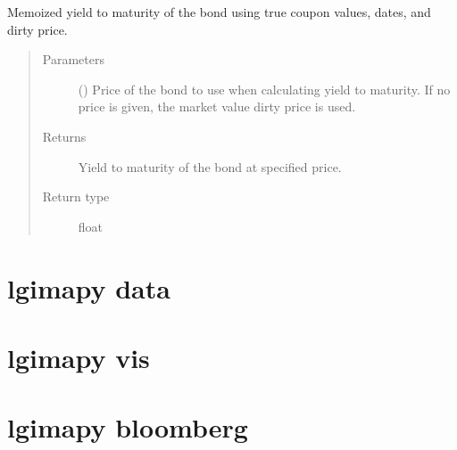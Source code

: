 \documentclass[letterpaper,10pt,english]{report}
\begin{document}
\begin{fulllineitems}
\begin{fulllineitems}
\label{\detokenize{index:lgimapy.models.TBond.ytm}}
Memoized yield to maturity of the bond using true coupon
values, dates, and dirty price.
\begin{quote}\begin{description}
\item[{Parameters}] \leavevmode
{} (\sphinxstyleliteralemphasis{\sphinxupquote{, }}) \textendash{} Price of the bond to use when calculating yield to maturity.
If no price is given, the market value dirty price is used.

\item[{Returns}] \leavevmode
{} \textendash{} Yield to maturity of the bond at specified price.

\item[{Return type}] \leavevmode
float

\end{description}\end{quote}

\end{fulllineitems}


\end{fulllineitems}



\chapter{lgimapy data}
\label{\detokenize{index:module-lgimapy.data}}\label{\detokenize{index:lgimapy-data}}

\chapter{lgimapy vis}
\label{\detokenize{index:module-lgimapy.vis}}\label{\detokenize{index:lgimapy-vis}}

\chapter{lgimapy bloomberg}
\label{\detokenize{index:module-lgimapy.bloomberg}}\label{\detokenize{index:lgimapy-bloomberg}}
\end{document}
